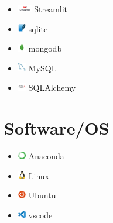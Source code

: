 \documentclass{article}
\begin{document}
\begin{multicols}{3}
\begin{itemize}
    \item \includegraphics[height=10pt]{images/icons/streamlit.png} Streamlit
    \item \includegraphics[height=10pt]{images/icons/sqlite-original.png} sqlite
    \item \includegraphics[height=10pt]{images/icons/mongodb-original.png} mongodb
    \item \includegraphics[height=10pt]{images/icons/mysql-original.png} MySQL
    \item \includegraphics[height=10pt]{images/icons/sqlalchemy-original.png} SQLAlchemy
\end{itemize}

\section*{Software/OS}
\begin{itemize}
    \item \includegraphics[height=10pt]{images/icons/anaconda-original.png} Anaconda
    \item \includegraphics[height=10pt]{images/icons/linux-original.png} Linux
    \item \includegraphics[height=10pt]{images/icons/ubuntu-plain.png} Ubuntu
    \item \includegraphics[height=10pt]{images/icons/vscode-original.png} vscode
\end{itemize}

\end{multicols}
\end{document}
